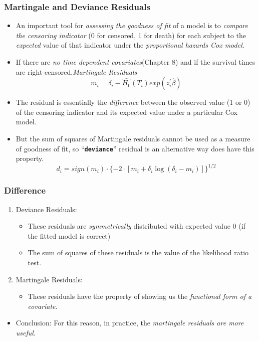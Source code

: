 \documentclass{beamer}
\newcommand{\empr}[1]{{\emph{\color{red}#1}}}
\newcommand{\pkg}[1]{{\textbf{\texttt{#1}}}}
\begin{document}
\pagebreak
\begin{frame}
\frametitle{Martingale and Deviance Residuals}
\begin{itemize}
\item An important tool for \empr{assessing the goodness of fit} of a model is to \empr{compare the censoring indicator} (0 for censored, 1 for death) for each subject to the \empr{expected} value of that indicator under the \empr{proportional hazards Cox model}.
\item If there are \empr{no time dependent covariates}(Chapter 8) and if the survival times are right-censored.\empr{Martingale Residuals} 
\begin{equation}
m_i = \delta_i - \hat{H_0}(T_i)exp(z_{i}^{'}\hat{\beta})
\end{equation}
\item The residual is essentially the \empr{difference} between the observed value (1 or 0) of the censoring indicator and its expected value under a particular Cox model.
\item But the sum of squares of Martingale residuals cannot be used as a measure of goodness of fit, so ``\pkg{deviance}'' residual is an alternative way does have this property.
\begin{equation}
d_i = sign(m_i)\cdot \lbrace -2\cdot [m_i+\delta_i \log(\delta_i - m_i)]\rbrace ^{1/2}
\end{equation}
\end{itemize}
\end{frame}

\pagebreak
\begin{frame}
\frametitle{Difference}
\begin{enumerate}
\item Deviance Residuals:
\begin{itemize}
\item These residuals are \empr{symmetrically} distributed with expected value 0 (if the fitted model is correct)
\item The sum of squares of these residuals is the value of the likelihood ratio test. 
\end{itemize}
\item Martingale Residuals:
\begin{itemize}
\item These residuals have the property of showing us the \empr{functional form of a covariate}.
\end{itemize}
\end{enumerate}
\begin{itemize}
\item Conclusion: For this reason, in practice, the \empr{martingale residuals are more useful}.
\end{itemize}
\end{frame}
\end{document}
